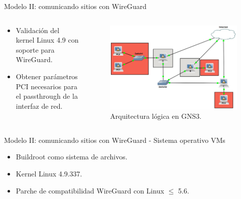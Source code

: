 \documentclass[serif, aspectratio=169]{beamer}
\begin{document}
\begin{frame}{Modelo II: comunicando sitios con WireGuard}
    \begin{columns}
        \begin{column}{0.35\textwidth}
            \begin{itemize}
                \item Validación del kernel Linux 4.9 con soporte para WireGuard.
                \item Obtener parámetros PCI necesarios para el passthrough de la interfaz de red.
            \end{itemize}
        \end{column}
        \begin{column}{0.6\textwidth}
            \begin{figure}
                \centering
                \includegraphics[width=\textwidth]{images/gns3_1.png}
                \caption{Arquitectura lógica en GNS3.}
            \end{figure}
        \end{column}
    \end{columns}
\end{frame}

\begin{frame}{Modelo II: comunicando sitios con WireGuard - Sistema operativo VMs}
        \begin{itemize}
            \item Buildroot como sistema de archivos.
            \item Kernel Linux 4.9.337.
            \item Parche de compatibilidad WireGuard con Linux $\leq$ 5.6.
        \end{itemize}
\end{frame}
\end{document}
